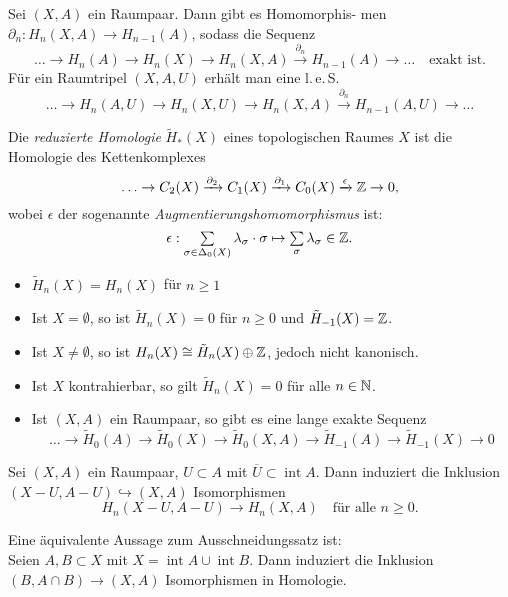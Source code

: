 \documentclass{cheat-sheet}
\newcommand{\RH}{\tilde{H}} %
\DeclareMathOperator{\inte}{int} %
\newcommand{\clos}[1]{\overline{#1}} %
\newcommand{\leS}{l.\,e.\,S.} %
\begin{document}
\begin{kor}
  Sei $(X, A)$ ein Raumpaar. Dann gibt es Homomorphis- men $\partial_n : H_n(X, A) \to H_{n-1}(A)$, sodass die Sequenz
  \[
    \ldots \to H_n(A) \to H_n(X) \to H_n(X, A) \xrightarrow{\partial_n} H_{n-1}(A) \to \ldots
    \quad \text{exakt ist.}
  \]
  Für ein Raumtripel $(X, A, U)$ erhält man eine \leS{}
  \[
    \ldots \to H_n(A, U) \to H_n(X, U) \to H_n(X, A) \xrightarrow{\partial_n} H_{n-1}(A, U) \to \ldots
  \]
\end{kor}

\begin{defn}
  Die \emph{reduzierte Homologie} $\RH_*(X)$ eines topologischen Raumes $X$ ist die Homologie des Kettenkomplexes
  \[ \ldots \to C_2(X) \xrightarrow{\partial_2} C_1(X) \xrightarrow{\partial_1} C_0(X) \xrightarrow{\epsilon} \mathbb{Z} \to 0, \]
  wobei $\epsilon$ der sogenannte \emph{Augmentierungshomomorphismus} ist:
  \[ \epsilon : \sum_{\sigma \in \Delta_0(X)} \lambda_\sigma \cdot \sigma \mapsto \sum_{\sigma} \lambda_\sigma \in \Z. \]
\end{defn}

\begin{prop}
  \begin{itemize}
    \item $\RH_n(X) = H_n(X)$ für $n \geq 1$
    \item Ist $X = \emptyset$, so ist $\RH_n(X) = 0$ für $n \geq 0$ und $\RH_{-1}(X) = \Z$.
    \item Ist $X \not= \emptyset$, so ist $H_n(X) \cong \RH_n(X) \oplus \Z$, jedoch nicht kanonisch.
    \item Ist $X$ kontrahierbar, so gilt $\RH_n(X) = 0$ für alle $n \in \mathbb{N}$.
    \item Ist $(X, A)$ ein Raumpaar, so gibt es eine lange exakte Sequenz
    \[ \ldots \to \RH_0(A) \to \RH_0(X) \to \RH_0(X,A) \to \RH_{-1}(A) \to \RH_{-1}(X) \to 0 \]
  \end{itemize}
\end{prop}


\begin{satz}
  Sei $(X, A)$ ein Raumpaar, $U \subset A$ mit $\clos{U} \subset \inte A$. Dann induziert die Inklusion $(X - U, A - U) \hookrightarrow (X, A)$ Isomorphismen
  \[ H_n(X - U, A - U) \to H_n(X, A) \quad \text{für alle $n \geq 0$.} \]
\end{satz}

\begin{bem}
  Eine äquivalente Aussage zum Ausschneidungssatz ist:\\
  Seien $A, B \subset X$ mit $X = \inte A \cup \inte B$. Dann induziert die Inklusion $(B, A \cap B) \to (X, A)$ Isomorphismen in Homologie.
\end{bem}
\end{document}
